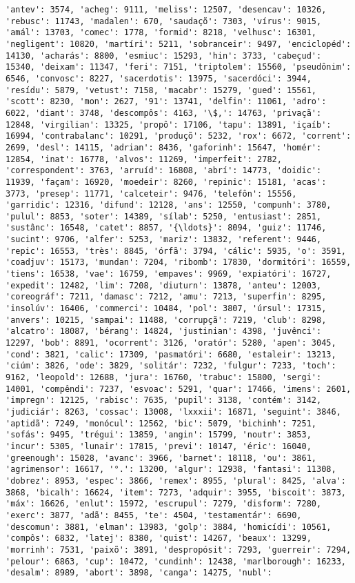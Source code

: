 \begin{Verbatim}[commandchars=\\\{\}]
'antev': 3574, 'acheg': 9111, 'meliss': 12507, 'desencav': 10326, 'rebusc': 11743, 'madalen': 670, 'saudaçõ': 7303, 'vírus': 9015, 'amál': 13703, 'comec': 1778, 'formid': 8218, 'velhusc': 16301, 'negligent': 10820, 'martíri': 5211, 'sobranceir': 9497, 'enciclopéd': 14130, 'acharás': 8800, 'esmiuc': 15293, 'hin': 3733, 'cabeçud': 15340, 'deixam': 11347, 'feri': 7151, 'triptolem': 15560, 'pseudônim': 6546, 'convosc': 8227, 'sacerdotis': 13975, 'sacerdóci': 3944, 'resídu': 5879, 'vetust': 7158, 'macabr': 15279, 'gued': 15561, 'scott': 8230, 'mon': 2627, '91': 13741, 'delfin': 11061, 'adro': 6022, 'diant': 3748, 'descompôs': 4163, '\$,': 14763, 'privaçã': 12848, 'virgilian': 13325, 'propô': 17106, 'tapu': 13891, 'içaíb': 16994, 'contrabalanc': 10291, 'produçõ': 5232, 'rox': 6672, 'corrent': 2699, 'desl': 14115, 'adrian': 8436, 'gaforinh': 15647, 'homér': 12854, 'inat': 16778, 'alvos': 11269, 'imperfeit': 2782, 'correspondent': 3763, 'arruíd': 16808, 'abrí': 14773, 'doidic': 11939, 'façam': 16920, 'moedeir': 8260, 'repinic': 15181, 'acas': 3773, 'presep': 11771, 'calceteir': 9476, 'telefôn': 15556, 'garridic': 12316, 'difund': 12128, 'ans': 12550, 'compunh': 3780, 'pulul': 8853, 'soter': 14389, 'sílab': 5250, 'entusiast': 2851, 'sustânc': 16548, 'catet': 8857, '{\ldots}': 8094, 'guiz': 11746, 'sucint': 9706, 'alfer': 5253, 'mariz': 13832, 'referent': 9446, 'repic': 16553, 'très': 8845, 'órfã': 3794, 'cálic': 5935, 'o': 3591, 'coadjuv': 15173, 'mundan': 7204, 'ribomb': 17830, 'dormitóri': 16559, 'tiens': 16538, 'vae': 16759, 'empaves': 9969, 'expiatóri': 16727, 'expedit': 12482, 'lim': 7208, 'diuturn': 13878, 'anteu': 12003, 'coreográf': 7211, 'damasc': 7212, 'amu': 7213, 'superfin': 8295, 'insolúv': 16406, 'commerci': 10484, 'pol': 3807, 'úrsul': 17315, 'anvers': 10215, 'sampai': 11488, 'corrupçã': 7219, 'club': 8298, 'alcatro': 18087, 'bérang': 14824, 'justinian': 4398, 'juvênci': 12297, 'bob': 8891, 'ocorrent': 3126, 'oratór': 5280, 'apen': 3045, 'cond': 3821, 'calic': 17309, 'pasmatóri': 6680, 'estaleir': 13213, 'ciúm': 3826, 'ode': 3829, 'solitár': 7232, 'fulgur': 7233, 'toch': 9162, 'leopold': 12688, 'jura': 16760, 'trabuc': 15800, 'sergi': 14001, 'compêndi': 7237, 'esvoac': 5291, 'quar': 17466, 'imens': 2601, 'impregn': 12125, 'rabisc': 7635, 'pupil': 3138, 'contém': 3142, 'judiciár': 8263, 'cossac': 13008, 'lxxxii': 16871, 'seguint': 3846, 'aptidã': 7249, 'monócul': 12562, 'bic': 5079, 'bichinh': 7251, 'sofás': 9495, 'trégui': 13859, 'angin': 15799, 'noutr': 3853, 'incur': 5305, 'lunair': 17815, 'previ': 10147, 'éric': 16040, 'greenough': 15028, 'avanc': 3966, 'barnet': 18118, 'ou': 3861, 'agrimensor': 16617, '°.': 13200, 'algur': 12938, 'fantasi': 11308, 'dobrez': 8953, 'espec': 3866, 'remex': 8955, 'plural': 8425, 'alva': 3868, 'bicalh': 16624, 'item': 7273, 'adquir': 3955, 'biscoit': 3873, 'máx': 16626, 'enlut': 15972, 'escrupul': 7279, 'disform': 7280, 'exerc': 3877, 'adã': 8455, 'te': 4504, 'testamentár': 6690, 'descomun': 3881, 'elman': 13983, 'golp': 3884, 'homicídi': 10561, 'compôs': 6832, 'latej': 8380, 'quist': 14267, 'beaux': 13299, 'morrinh': 7531, 'paixõ': 3891, 'despropósit': 7293, 'guerreir': 7294, 'pelour': 6863, 'cup': 10472, 'cundinh': 12438, 'marlborough': 16233, 'desalm': 8989, 'abort': 3898, 'canga': 14275, 'nubl': 
\end{Verbatim}
